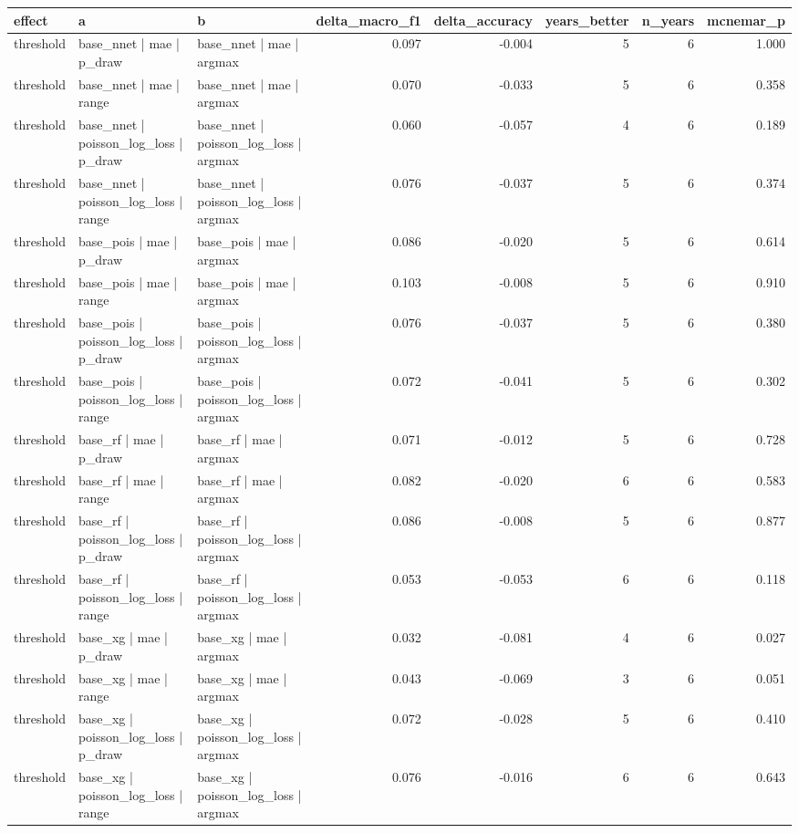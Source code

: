 
\begin{tabular}{lllrrrrr}
\toprule
effect & a & b & delta\_macro\_f1 & delta\_accuracy & years\_better & n\_years & mcnemar\_p\\
\midrule
threshold & base\_nnet | mae | p\_draw & base\_nnet | mae | argmax & 0.097 & -0.004 & 5 & 6 & 1.000\\
threshold & base\_nnet | mae | range & base\_nnet | mae | argmax & 0.070 & -0.033 & 5 & 6 & 0.358\\
threshold & base\_nnet | poisson\_log\_loss | p\_draw & base\_nnet | poisson\_log\_loss | argmax & 0.060 & -0.057 & 4 & 6 & 0.189\\
threshold & base\_nnet | poisson\_log\_loss | range & base\_nnet | poisson\_log\_loss | argmax & 0.076 & -0.037 & 5 & 6 & 0.374\\
threshold & base\_pois | mae | p\_draw & base\_pois | mae | argmax & 0.086 & -0.020 & 5 & 6 & 0.614\\
threshold & base\_pois | mae | range & base\_pois | mae | argmax & 0.103 & -0.008 & 5 & 6 & 0.910\\
threshold & base\_pois | poisson\_log\_loss | p\_draw & base\_pois | poisson\_log\_loss | argmax & 0.076 & -0.037 & 5 & 6 & 0.380\\
threshold & base\_pois | poisson\_log\_loss | range & base\_pois | poisson\_log\_loss | argmax & 0.072 & -0.041 & 5 & 6 & 0.302\\
threshold & base\_rf | mae | p\_draw & base\_rf | mae | argmax & 0.071 & -0.012 & 5 & 6 & 0.728\\
threshold & base\_rf | mae | range & base\_rf | mae | argmax & 0.082 & -0.020 & 6 & 6 & 0.583\\
threshold & base\_rf | poisson\_log\_loss | p\_draw & base\_rf | poisson\_log\_loss | argmax & 0.086 & -0.008 & 5 & 6 & 0.877\\
threshold & base\_rf | poisson\_log\_loss | range & base\_rf | poisson\_log\_loss | argmax & 0.053 & -0.053 & 6 & 6 & 0.118\\
threshold & base\_xg | mae | p\_draw & base\_xg | mae | argmax & 0.032 & -0.081 & 4 & 6 & 0.027\\
threshold & base\_xg | mae | range & base\_xg | mae | argmax & 0.043 & -0.069 & 3 & 6 & 0.051\\
threshold & base\_xg | poisson\_log\_loss | p\_draw & base\_xg | poisson\_log\_loss | argmax & 0.072 & -0.028 & 5 & 6 & 0.410\\
threshold & base\_xg | poisson\_log\_loss | range & base\_xg | poisson\_log\_loss | argmax & 0.076 & -0.016 & 6 & 6 & 0.643\\

\end{tabular}

